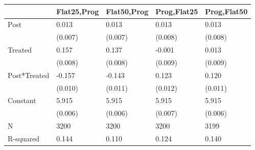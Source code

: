 \begin{tabular}{lllll}
\toprule
 & Flat25,Prog & Flat50,Prog & Prog,Flat25 & Prog,Flat50 \\
\midrule
Post & 0.013 & 0.013 & 0.013 & 0.013 \\
 & (0.007) & (0.007) & (0.008) & (0.008) \\
Treated & 0.157 & 0.137 & -0.001 & 0.013 \\
 & (0.008) & (0.008) & (0.009) & (0.009) \\
Post*Treated & -0.157 & -0.143 & 0.123 & 0.120 \\
 & (0.010) & (0.011) & (0.012) & (0.011) \\
Constant & 5.915 & 5.915 & 5.915 & 5.915 \\
 & (0.006) & (0.006) & (0.007) & (0.006) \\
N & 3200 & 3200 & 3200 & 3199 \\
R-squared & 0.144 & 0.110 & 0.124 & 0.140 \\
\bottomrule
\end{tabular}
